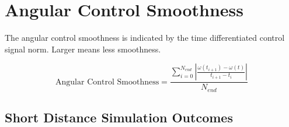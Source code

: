 \section{Angular Control Smoothness}
The angular control smoothness is indicated by the time differentiated control 
signal norm. Larger means less smoothness.

\begin{equation} 
     \text{Angular Control Smoothness}
     = \frac{\sum_{i=0}^{N_{end}} | \frac{\omega(t_{i+1}) - \omega(t)}{t_{i+1} - t_i} |}{N_{end}}
\end{equation}

\subsection{Short Distance Simulation Outcomes}
\vspace*{-0.5em}
